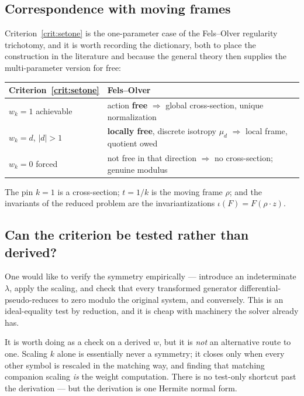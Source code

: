 \documentclass[11pt]{article}
\theoremstyle{plain}
\theoremstyle{definition}
\theoremstyle{remark}
\begin{document}
\subsection{Correspondence with moving frames}

Criterion~\ref{crit:setone} is the one-parameter case of the Fels--Olver
regularity trichotomy, and it is worth recording the dictionary, both to place
the construction in the literature and because the general theory then supplies
the multi-parameter version for free:

\begin{center}
\begin{tabular}{l l}
\toprule
Criterion~\ref{crit:setone} & Fels--Olver \cite{FelsOlverI,FelsOlverII} \\
\midrule
$w_k = 1$ achievable      & action \textbf{free} $\Rightarrow$ global cross-section, unique normalization \\
$w_k = d$, $|d| > 1$      & \textbf{locally free}, discrete isotropy $\mu_d$ $\Rightarrow$ local frame, quotient owed \\
$w_k = 0$ forced          & not free in that direction $\Rightarrow$ no cross-section; genuine modulus \\
\bottomrule
\end{tabular}
\end{center}

The pin $k = 1$ is a cross-section; $t = 1/k$ is the moving frame $\rho$; and
the invariants of the reduced problem are the invariantizations
$\iota(F) = F(\rho \cdot z)$.

\subsection{Can the criterion be tested rather than derived?}

One would like to verify the symmetry empirically --- introduce an
indeterminate $\lambda$, apply the scaling, and check that every transformed
generator differential-pseudo-reduces to zero modulo the original system, and
conversely. This is an ideal-equality test by reduction, and it is cheap with
machinery the solver already has.

It is worth doing as a check on a derived $w$, but it is \emph{not} an
alternative route to one. Scaling $k$ alone is essentially never a symmetry; it
closes only when every other symbol is rescaled in the matching way, and
finding that matching companion scaling \emph{is} the weight computation. There
is no test-only shortcut past the derivation --- but the derivation is one
Hermite normal form.
\end{document}
